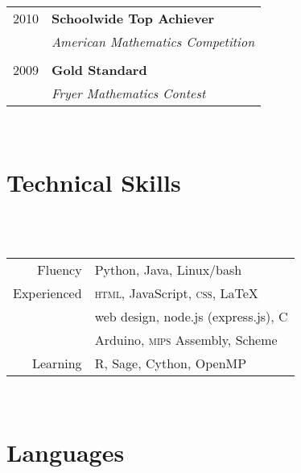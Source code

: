 \documentclass[10pt]{article} %
\begin{document}
{\begin{minipage}[t]{0.44\textwidth}
\begin{tabular}{rl}

2010	 & \textbf{Schoolwide Top Achiever}\\
& \textit{American Mathematics Competition}\\ \\


2009	 & \textbf{Gold Standard}\\
& \textit{Fryer Mathematics Contest}
\end{tabular}\\[10pt]


\section{Technical Skills} 
\\[10pt] \\[10pt]

\begin{tabular}{rl}
Fluency
& Python, Java, Linux/bash \\
Experienced
& \textsc{html}, JavaScript, \textsc{css}, \LaTeX \\
& web design, node.js (express.js), C \\
& Arduino, \textsc{mips} Assembly, Scheme \\
Learning
& R, Sage, Cython, OpenMP
\end{tabular}\\[10pt]


\section{Languages}
\\

\\[10pt]



\end{minipage}}
\end{document}
